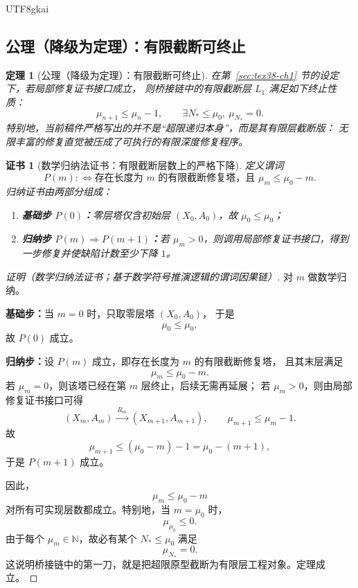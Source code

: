 \documentclass[12pt]{article}
\newtheorem{theorem}{定理}[section]
\newtheorem{Certificate}{证书}[section]
\newcommand{\NN}{\mathbb{N}}
\begin{document}
\begin{CJK*}{UTF8}{gkai}
\subsection{公理（降级为定理）：有限截断可终止}
\label{subsec:tex38-bridge-truncation}

\begin{theorem}[公理（降级为定理）：有限截断可终止]
\label{thm:tex38-bridge-truncation}
在第~\ref{sec:tex38-ch1} 节的设定下，若局部修复证书接口成立，
则桥接链中的有限截断层 $L_1$ 满足如下终止性质：
\[
  \mu_{n+1}\le \mu_n-1,
  \qquad
  \exists N_\ast\le \mu_0,\ \mu_{N_\ast}=0.
\]
特别地，当前稿件严格写出的并不是“超限递归本身”，而是其有限层截断版：
无限丰富的修复直觉被压成了可执行的有限深度修复程序。
\end{theorem}

\begin{Certificate}[数学归纳法证书：有限截断层数上的严格下降]
\label{cert:tex38-bridge-truncation}
定义谓词
\[
  P(m)
  :
  \Longleftrightarrow
  \text{存在长度为 $m$ 的有限截断修复塔，且 }\mu_m\le \mu_0-m.
\]
归纳证书由两部分组成：
\begin{enumerate}
  \item \textbf{基础步 $P(0)$：}零层塔仅含初始层 $(X_0,A_0)$，故 $\mu_0\le\mu_0$；
  \item \textbf{归纳步 $P(m)\Rightarrow P(m+1)$：}若 $\mu_m>0$，则调用局部修复证书接口，得到一步修复并使缺陷计数至少下降 $1$。
\end{enumerate}
\end{Certificate}

\begin{proof}[证明（数学归纳法证书；基于数学符号推演逻辑的谓词因果链）]
对 $m$ 做数学归纳。

\textbf{基础步：}当 $m=0$ 时，只取零层塔 $(X_0,A_0)$，
于是
\[
  \mu_0\le\mu_0,
\]
故 $P(0)$ 成立。

\textbf{归纳步：}设 $P(m)$ 成立，即存在长度为 $m$ 的有限截断修复塔，
且其末层满足
\[
  \mu_m\le\mu_0-m.
\]
若 $\mu_m=0$，则该塔已经在第 $m$ 层终止，后续无需再延展；
若 $\mu_m>0$，则由局部修复证书接口可得
\[
  (X_m,A_m)\xrightarrow{\,R_m\,}(X_{m+1},A_{m+1}),
  \qquad
  \mu_{m+1}\le\mu_m-1.
\]
故
\[
  \mu_{m+1}\le(\mu_0-m)-1=\mu_0-(m+1),
\]
于是 $P(m+1)$ 成立。

因此，
\[
  \mu_m\le\mu_0-m
\]
对所有可实现层数都成立。特别地，当 $m=\mu_0$ 时，
\[
  \mu_{\mu_0}\le 0.
\]
由于每个 $\mu_m\in\NN$，故必有某个 $N_\ast\le\mu_0$ 满足
\[
  \mu_{N_\ast}=0.
\]
这说明桥接链中的第一刀，就是把超限原型截断为有限层工程对象。定理成立。
\end{proof}


\end{CJK*}
\end{document}
